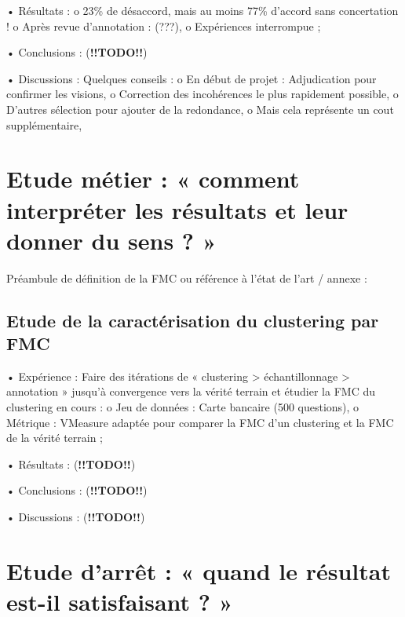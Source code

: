        •	Résultats :
            o	23\% de désaccord, mais au moins 77\% d’accord sans concertation !
            o	Après revue d’annotation : (???),
            o	Expériences interrompue ;

        •	Conclusions :  (\textbf{!!TODO!!})

        •	Discussions : Quelques conseils :
            o	En début de projet : Adjudication pour confirmer les visions,
            o	Correction des incohérences le plus rapidement possible,
            o	D’autres sélection pour ajouter de la redondance,
            o	Mais cela représente un cout supplémentaire,


    \section{Etude métier : « comment interpréter les résultats et leur donner du sens ? »}

        Préambule de définition de la FMC ou référence à l’état de l’art / annexe :

        \subsection{Etude de la caractérisation du clustering par FMC}

        •	Expérience : Faire des itérations de « clustering > échantillonnage > annotation » jusqu’à convergence vers la vérité terrain et étudier la FMC du clustering en cours :
            o	Jeu de données : Carte bancaire (500 questions),
            o	Métrique : VMeasure adaptée pour comparer la FMC d’un clustering et la FMC de la vérité terrain ;

        •	Résultats : (\textbf{!!TODO!!})

        •	Conclusions : (\textbf{!!TODO!!})

        •	Discussions : (\textbf{!!TODO!!})


    \section{Etude d’arrêt : « quand le résultat est-il satisfaisant ? »}
        
